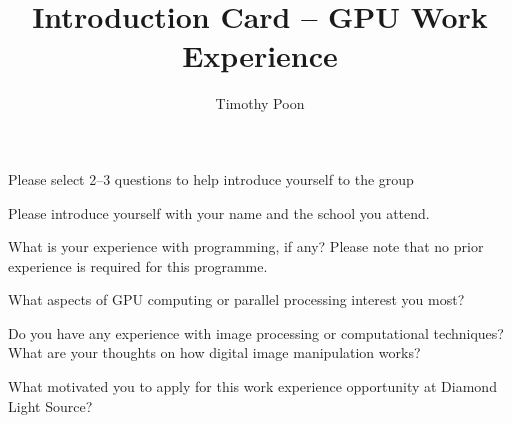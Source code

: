\documentclass[11pt, a5paper]{article}
\title{Introduction Card -- GPU Work Experience}
\author{Timothy Poon}
\date{}
\begin{document}
\vspace*{\fill}
\begin{center}

\begin{tcolorbox}[
    width=138mm,
    height=200mm,
    colback=white,
    colframe=black!20,  %
    boxrule=0.5pt,
    arc=3.75mm,
    shadow={0mm}{-2mm}{4mm}{black!10},
    left=5mm,
    right=5mm,
    top=5mm,
    bottom=15mm,  %
    enhanced,
    overlay={
        \node[anchor=south, inner sep=0pt] at ([yshift=5mm]frame.south) {
            \footnotesize
            \itshape
            \color{colortextsecondary}
            Data analysis: Scientific image processing by GPU
        };
    }
]

\begin{tcolorbox}[
    colback=white,
    colframe=colorprimarydark,
    boxrule=0.5mm,
    arc=2mm,
    center title,
    halign=center,
    left=3mm,
    right=3mm,
    top=3mm,
    bottom=3mm
]
    \color{colorprimarydark}
    \small
    Please select 2--3 questions to help introduce yourself to the group
\end{tcolorbox}

\vspace{5mm}

\begin{questionbox}{1}
    \color{colortextprimary}
    Please introduce yourself with your name and the school you attend.
\end{questionbox}

\begin{questionbox}{2}
    \color{colortextprimary}
    What is your experience with programming, if any? Please note that no prior experience is required for this programme.
\end{questionbox}

\begin{questionbox}{3}
    \color{colortextprimary}
    What aspects of GPU computing or parallel processing interest you most?
\end{questionbox}

\begin{questionbox}{4}
    \color{colortextprimary}
    Do you have any experience with image processing or computational techniques? What are your thoughts on how digital image manipulation works?
\end{questionbox}

\begin{questionbox}{5}
    \color{colortextprimary}
    What motivated you to apply for this work experience opportunity at Diamond Light Source?
\end{questionbox}

\end{tcolorbox}

\end{center}
\vspace*{\fill}
\end{document}
